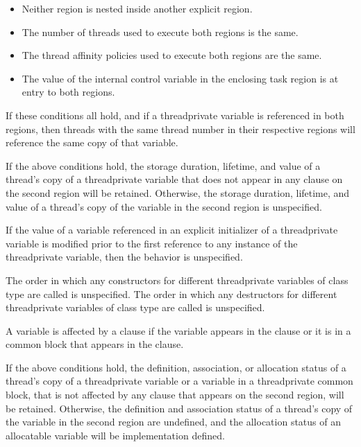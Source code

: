 {{{{\begin{itemize}  %
\item Neither  region is nested inside another explicit  region. 

\item The number of threads used to execute both  regions is the same. 

\item The thread affinity policies used to execute both  regions are the same. 

\item The value of the  internal control variable in the enclosing task region is  
at entry to both  regions.
\end{itemize} %

If these conditions all hold, and if a threadprivate variable is referenced in both regions, 
then threads with the same thread number in their respective regions will reference the 
same copy of that variable.

\ccppspecificstart
If the above conditions hold, the storage duration, lifetime, and value of a thread’s copy 
of a threadprivate variable that does not appear in any  clause on the second 
region will be retained. Otherwise, the storage duration, lifetime, and value of a thread’s 
copy of the variable in the second region is unspecified.

If the value of a variable referenced in an explicit initializer of a threadprivate variable 
is modified prior to the first reference to any instance of the threadprivate variable, then 
the behavior is unspecified. 
\ccppspecificend

\cppspecificstart
The order in which any constructors for different threadprivate variables of class type 
are called is unspecified. The order in which any destructors for different threadprivate 
variables of class type are called is unspecified. 
\cppspecificend

\fortranspecificstart
A variable is affected by a  clause if the variable appears in the  clause 
or it is in a common block that appears in the  clause. 

If the above conditions hold, the definition, association, or allocation status of a thread’s 
copy of a threadprivate variable or a variable in a threadprivate common 
block, that is not affected by any  clause that appears on the second region, will 
be retained. Otherwise, the definition and association status of a thread’s copy of the 
variable in the second region are undefined, and the allocation status of an allocatable 
variable will be implementation defined. 

}}}}
